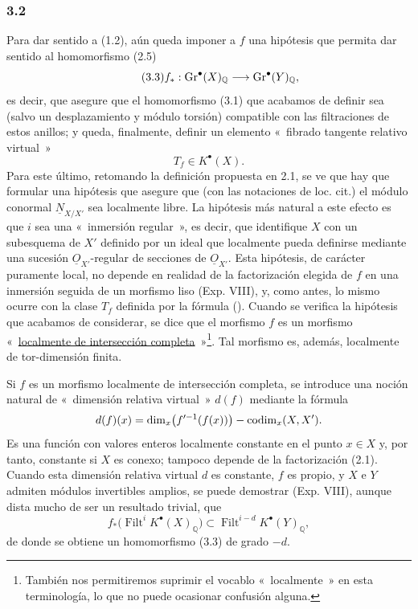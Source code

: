 \subsubsection*{3.2}
Para dar sentido a (1.2), aún queda imponer a $f$ una hipótesis que permita
dar sentido al homomorfismo (2.5)
\begin{equation}\tag{3.3}
f_*:\operatorname{Gr}^\bullet(X)_{\mathbb Q}\longrightarrow \operatorname{Gr}^\bullet(Y)_{\mathbb Q},
\end{equation}
es decir, que asegure que el homomorfismo (3.1) que acabamos de definir sea
(salvo un desplazamiento y módulo torsión) compatible con las filtraciones
de estos anillos; y queda, finalmente, definir un elemento «~fibrado tangente
relativo virtual~»
\[
T_f\in K^\bullet(X).
\]
Para este último, retomando la definición propuesta en 2.1, se ve que hay que
formular una hipótesis que asegure que (con las notaciones de loc. cit.) el
módulo conormal $\underline N_{X/X'}$ sea localmente libre. La hipótesis más
natural a este efecto es que $i$ sea una «~inmersión regular~», es decir, que
identifique $X$ con un subesquema de $X'$ definido por un ideal que
localmente pueda definirse mediante una sucesión
$\underline O_{X'}$-regular de secciones de $\underline O_{X'}$. Esta
hipótesis, de carácter puramente local, no depende en realidad de la
factorización elegida de $f$ en una inmersión seguida de un morfismo liso
(Exp. VIII), y, como antes, lo mismo ocurre con la clase $T_f$ definida por
la fórmula (). Cuando se verifica la hipótesis que acabamos de considerar, %
se dice que el morfismo $f$ es un morfismo
«~\underline{localmente de intersección completa}~»\footnote{También nos
permitiremos suprimir el vocablo «~localmente~» en esta terminología, lo que
no puede ocasionar confusión alguna.}. Tal morfismo es, además, localmente de
tor-dimensión finita.

Si $f$ es un morfismo localmente de intersección completa, se introduce una
noción natural de «~dimensión relativa virtual~» $d(f)$ mediante la fórmula
\[
d(f)(x)=\dim_x\bigl(f'^{-1}(f(x))\bigr)-\operatorname{codim}_x(X,X').
\]
Es una función con valores enteros localmente constante en el punto $x\in X$
y, por tanto, constante si $X$ es conexo; tampoco depende de la factorización
(2.1). Cuando esta dimensión relativa virtual $d$ es constante, $f$ es
propio, y $X$ e $Y$ admiten módulos invertibles amplios, se puede demostrar
(Exp. VIII), aunque dista mucho de ser un resultado trivial, que
\begin{equation}\tag{3.4}
f_*\bigl(\operatorname{Filt}^iK^\bullet(X)_{\mathbb Q}\bigr)\subset \operatorname{Filt}^{i-d}K^\bullet(Y)_{\mathbb Q},
\end{equation}
de donde se obtiene un homomorfismo (3.3) de grado $-d$.

